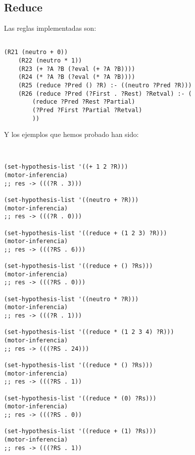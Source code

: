 \documentclass[nochap]{apuntes}
\begin{document}
\subsection*{Reduce}
Las reglas implementadas son:\\
\begin{lstlisting}[frame=single]

(R21 (neutro + 0))
	(R22 (neutro * 1))
	(R23 (+ ?A ?B (?eval (+ ?A ?B))))
	(R24 (* ?A ?B (?eval (* ?A ?B))))
	(R25 (reduce ?Pred () ?R) :- ((neutro ?Pred ?R)))
	(R26 (reduce ?Pred (?First . ?Rest) ?Retval) :- (
		(reduce ?Pred ?Rest ?Partial)
		(?Pred ?First ?Partial ?Retval)
		))
\end{lstlisting}
Y los ejemplos que hemos probado han sido:\\


\begin{lstlisting}[frame=single]


(set-hypothesis-list '((+ 1 2 ?R)))
(motor-inferencia)
;; res -> (((?R . 3)))

(set-hypothesis-list '((neutro + ?R)))
(motor-inferencia)
;; res -> (((?R . 0)))

(set-hypothesis-list '((reduce + (1 2 3) ?R)))
(motor-inferencia)
;; res -> (((?RS . 6)))

(set-hypothesis-list '((reduce + () ?Rs)))
(motor-inferencia)
;; res -> (((?RS . 0)))

(set-hypothesis-list '((neutro * ?R)))
(motor-inferencia)
;; res -> (((?R . 1)))

(set-hypothesis-list '((reduce * (1 2 3 4) ?R)))
(motor-inferencia)
;; res -> (((?RS . 24)))

(set-hypothesis-list '((reduce * () ?Rs)))
(motor-inferencia)
;; res -> (((?RS . 1))

(set-hypothesis-list '((reduce * (0) ?Rs)))
(motor-inferencia)
;; res -> (((?RS . 0))

(set-hypothesis-list '((reduce + (1) ?Rs)))
(motor-inferencia)
;; res -> (((?RS . 1))
\end{lstlisting}
\end{document}

